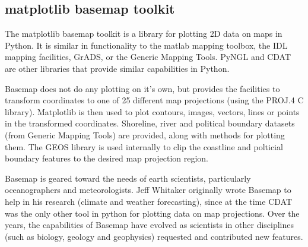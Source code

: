 \subsection{matplotlib basemap toolkit}

The matplotlib basemap toolkit is a library for plotting 2D data on maps in Python. It is similar in functionality to the matlab mapping toolbox, the IDL mapping facilities, GrADS, or the Generic Mapping Tools. PyNGL and CDAT are other libraries that provide similar capabilities in Python.

Basemap does not do any plotting on it’s own, but provides the facilities to transform coordinates to one of 25 different map projections (using the PROJ.4 C library). Matplotlib is then used to plot contours, images, vectors, lines or points in the transformed coordinates. Shoreline, river and political boundary datasets (from Generic Mapping Tools) are provided, along with methods for plotting them. The GEOS library is used internally to clip the coastline and polticial boundary features to the desired map projection region.

Basemap is geared toward the needs of earth scientists, particularly oceanographers and meteorologists. Jeff Whitaker originally wrote Basemap to help in his research (climate and weather forecasting), since at the time CDAT was the only other tool in python for plotting data on map projections. Over the years, the capabilities of Basemap have evolved as scientists in other disciplines (such as biology, geology and geophysics) requested and contributed new features.

